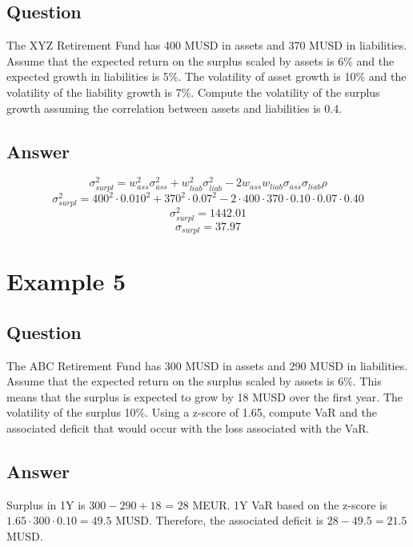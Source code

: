\subsection{Question}
The XYZ Retirement Fund has 400 MUSD in assets and 370 MUSD in liabilities. Assume that the expected return on the surplus scaled by assets is 6\% and the expected growth in liabilities is 5\%. The volatility of asset growth is 10\% and the volatility of the liability growth is 7\%. Compute the volatility of the surplus growth assuming the correlation between assets and liabilities is 0.4.

\subsection{Answer}
\begin{equation*}
\sigma^2_{surpl} = w^2_{ass}\sigma^2_{ass} + w^2_{liab}\sigma^2_{liab} - 2 w_{ass} w_{liab} \sigma_{ass} \sigma_{liab} \rho
\end{equation*}
\begin{equation*}
\sigma^2_{surpl} = 400^2 \cdot 0.010^2 + 370^2 \cdot 0.07^2 - 2 \cdot 400 \cdot 370 \cdot 0.10 \cdot 0.07 \cdot 0.40
\end{equation*}
\begin{equation*}
\sigma^2_{surpl} = 1442.01
\end{equation*}
\begin{equation*}
\sigma_{surpl} = 37.97
\end{equation*}

\section{Example 5}

\subsection{Question}
The ABC Retirement Fund has 300 MUSD in assets and 290 MUSD in liabilities. Assume that the expected return on the surplus scaled by assets is 6\%. This means that the surplus is expected to grow by 18 MUSD over the first year. The volatility of the surplus 10\%. Using a z-score of 1.65, compute VaR and the associated deficit that would occur with the loss associated with the VaR.

\subsection{Answer}
Surplus in 1Y is $300 - 290 + 18$ = 28 MEUR. 1Y VaR based on the z-score is $1.65 \cdot 300 \cdot 0.10 = 49.5$ MUSD. Therefore, the associated deficit is $28 - 49.5 = 21.5$ MUSD.


